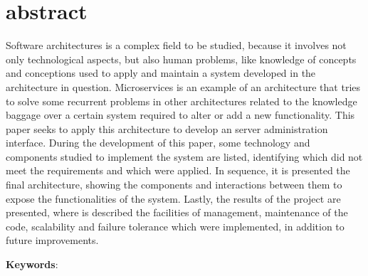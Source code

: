\chapter*{abstract}

\noindent  Software architectures is a complex field to be studied,
because it involves not only technological aspects, but also human
problems, like knowledge of concepts and conceptions used to apply
and maintain a system developed in the architecture in question.
Microservices is an example of an architecture that tries to solve
some recurrent problems in other architectures related to the knowledge
baggage over a certain system required to alter or add a new functionality.
This paper seeks to apply this architecture to develop an server
administration interface. During the development of this paper, some
technology and components studied to implement the system are listed,
identifying which did not meet the requirements and which were applied.
In sequence, it is presented the final architecture, showing the components
and interactions between them to expose the functionalities of the system.
Lastly, the results of the project are presented, where is described the
facilities of management, maintenance of the code, scalability and failure
tolerance which were implemented, in addition to future improvements.

\noindent \textbf{Keywords}: \enUSKeyword
